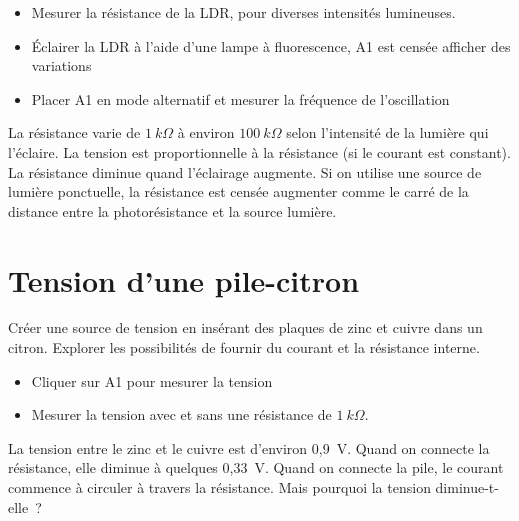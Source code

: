 \documentclass[a4paper,12pt,french]{sphinxmanual}
\let\sphinxpxdimen\pdfpxdimen\else\newdimen\sphinxpxdimen
\begin{document}
\begin{itemize}
\item {} 
Mesurer la résistance de la LDR, pour diverses intensités lumineuses.

\item {} 
Éclairer la LDR à l’aide d’une lampe à fluorescence, A1 est censée
afficher des variations

\item {} 
Placer A1 en mode alternatif et mesurer la fréquence de l’oscillation

\end{itemize}


La résistance varie de \(1~k\Omega\) à environ \(100~k\Omega\)
selon l’intensité de la lumière qui l’éclaire. La tension est
proportionnelle à la résistance (si le courant est constant). La
résistance diminue quand l’éclairage augmente. Si on utilise une
source de lumière ponctuelle, la résistance est censée augmenter comme
le carré de la distance entre la photorésistance et la source lumière.


\section{Tension d’une pile-citron}
\label{\detokenize{2.11:tension-dune-pile-citron}}\label{\detokenize{2.11::doc}}

Créer une source de tension en insérant des plaques de zinc et cuivre
dans un citron. Explorer les possibilités de fournir du courant et la
résistance interne.

\noindent\sphinxincludegraphics[width=300\sphinxpxdimen]{{lemon-cell}.pdf}

\begin{itemize}
\item {} 
Cliquer sur A1 pour mesurer la tension

\item {} 
Mesurer la tension avec et sans une résistance de \(1~k\Omega\).

\end{itemize}


La tension entre le zinc et le cuivre est d’environ 0,9 V. Quand on
connecte la résistance, elle diminue à quelques 0,33 V. Quand on
connecte la pile, le courant commence à circuler à travers la
résistance. Mais pourquoi la tension diminue-t-elle ?
\end{document}
